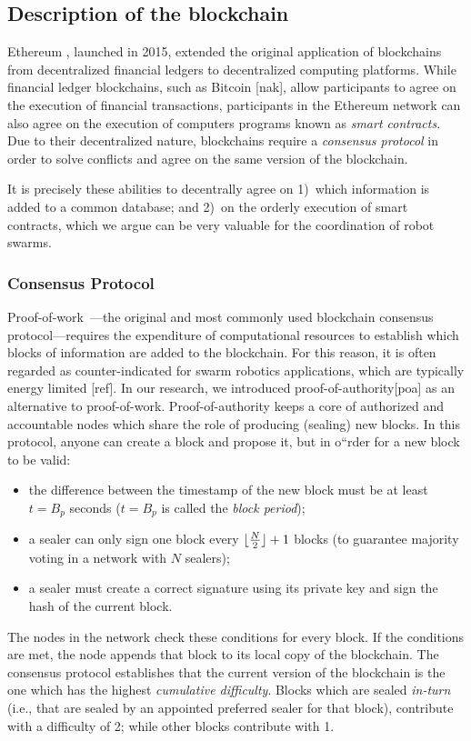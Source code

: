 \documentclass[runningheads]{llncs}
\DeclarePairedDelimiter\floor{\lfloor}{\rfloor}
\newcommand{\poa}{proof-of-authority\xspace}
\newcommand{\Poa}{Proof-of-authority\xspace}
\newcommand{\pow}{proof-of-work\xspace}
\newcommand{\Pow}{Proof-of-work\xspace}
\begin{document}
\subsection{Description of the blockchain}
 Ethereum \cite{ethereum_online}, launched in 2015, extended the original application of blockchains from decentralized financial ledgers to decentralized computing platforms. While financial ledger blockchains, such as Bitcoin [nak], allow participants to agree on the execution of financial transactions, participants in the Ethereum network can also agree on the execution of computers programs known as \emph{smart contracts}. Due to their decentralized nature, blockchains require a \emph{consensus protocol} in order to solve conflicts and agree on the same version of the blockchain.

It is precisely these abilities to decentrally agree on 1)~which information is added to a common database; and 2)~on the orderly execution of smart contracts, which we argue can be very valuable for the coordination of robot swarms.

\subsubsection{Consensus Protocol}
\label{sec:consensus-protocol}
\Pow~\cite{bitcoin_online}---the original and most commonly used blockchain consensus protocol---requires the expenditure of computational resources to establish which blocks of information are added to the blockchain. For this reason, it is often regarded as counter-indicated for swarm robotics applications, which are typically energy limited [ref].
In our research, we introduced \poa [poa] as an alternative to \pow. \Poa keeps a core of authorized and accountable nodes which share the role of producing (sealing) new blocks. In this protocol, anyone can create a block and propose it, but in o``rder for a new block to be valid:
\begin{itemize}
\item the difference between the timestamp of the new block must be at least $t=B_p$ seconds ($t=B_p$ is called the \emph{block period});
\item a sealer can only sign one block every $\floor{\frac{N}{2}} + 1$ blocks
  (to guarantee majority voting in a network with $N$ sealers);
\item a sealer must create a correct signature using its private key and sign the hash of the current block.
\end{itemize}
The nodes in the network check these conditions for every block. If the conditions are met, the node appends that block to its local copy of the blockchain. The consensus protocol establishes that the current version of the blockchain is the one which has the highest \emph{cumulative difficulty}. Blocks which are sealed \emph{in-turn} (i.e., that are sealed by an appointed preferred sealer for that block), contribute with a difficulty of 2; while other blocks contribute with 1.
\end{document}
